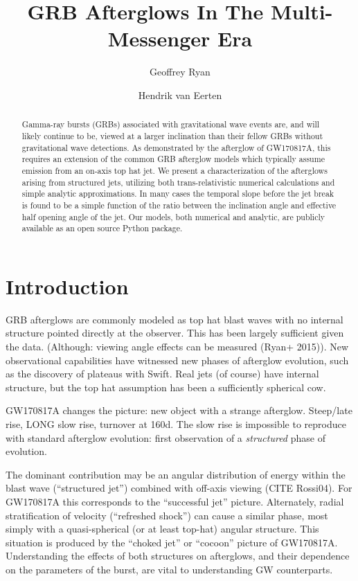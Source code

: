 \documentclass[twocolumn]{aastex62}
\newcommand{\gwbns}{GW170817A}
\begin{document}
\title{GRB Afterglows In The Multi-Messenger Era}

\author[0000-0001-9068-7157]{Geoffrey Ryan}

\author{Hendrik van Eerten}


\begin{abstract}
	Gamma-ray bursts (GRBs) associated with gravitational wave events are, and will likely continue to be, viewed at a larger inclination than their fellow GRBs without gravitational wave detections.  As demonstrated by the afterglow of \gwbns{}, this requires an extension of the common GRB afterglow models which typically assume emission from an on-axis top hat jet.  We present a characterization of the afterglows arising from structured jets, utilizing both trans-relativistic numerical calculations and simple analytic approximations.  In many cases the temporal slope before the jet break is found to be a simple function of the ratio between the inclination angle and effective half opening angle of the jet.  Our models, both numerical and analytic, are publicly available as an open source Python package.
	
\end{abstract}

\section{Introduction}

GRB afterglows are commonly modeled as top hat blast waves with no internal structure pointed directly at the observer.  This has been largely sufficient given the data.  (Although: viewing angle effects can be measured (Ryan+ 2015)).  New observational capabilities have witnessed new phases of afterglow evolution, such as the discovery of plateaus with Swift.  Real jets (of course) have internal structure, but the top hat assumption has been a sufficiently spherical cow. 

\gwbns{} changes the picture: new object with a strange afterglow.  Steep/late rise, LONG slow rise, turnover at 160d.  The slow rise is impossible to reproduce with standard afterglow evolution: first observation of a \emph{structured} phase of evolution. 

The dominant contribution may be an angular distribution of energy within the blast wave (``structured jet'') combined with off-axis viewing (CITE Rossi04).  For \gwbns{} this corresponds to the ``successful jet'' picture.  Alternately, radial stratification of velocity (``refreshed shock'') can cause a similar phase, most simply with a quasi-spherical (or at least top-hat) angular structure.  This situation is produced by the ``choked jet''  or ``cocoon'' picture of \gwbns{}. Understanding the effects of both structures on afterglows, and their dependence on the parameters of the burst, are vital to understanding GW counterparts.
\end{document}
